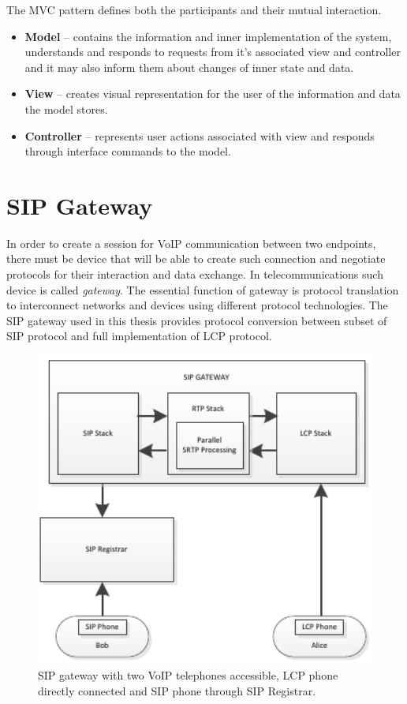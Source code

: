 The MVC pattern defines both the participants and their mutual interaction.
\begin{itemize}
\item \textbf{Model} -- contains the information and inner implementation of
the system, understands and responds to requests from it's associated view and controller and it may also inform them about changes of inner state and data.
\item \textbf{View} -- creates visual representation for the user of the
information and data the model stores.                 
\item \textbf{Controller} -- represents user actions associated with view and
responds through interface commands to the model.
\end{itemize} 

\section{SIP Gateway}
In order to create a session for VoIP communication between two endpoints, 
there must be device that will be able to create such connection and negotiate
protocols for their interaction and data exchange. In telecommunications such
device is called \textit{gateway}. The essential function of gateway is 
protocol translation to interconnect networks and devices using different
protocol technologies. The SIP gateway used in this thesis provides protocol
conversion between subset of SIP protocol and full implementation of LCP 
protocol.

\begin{figure}[h!]
\centering
\includegraphics[width=13cm]{fig/scenario1.pdf}
\caption[Gateway scenario]{SIP gateway with two VoIP telephones accessible, LCP 
phone directly connected and SIP phone through SIP Registrar.}
\label{oclpm}
\end{figure}

